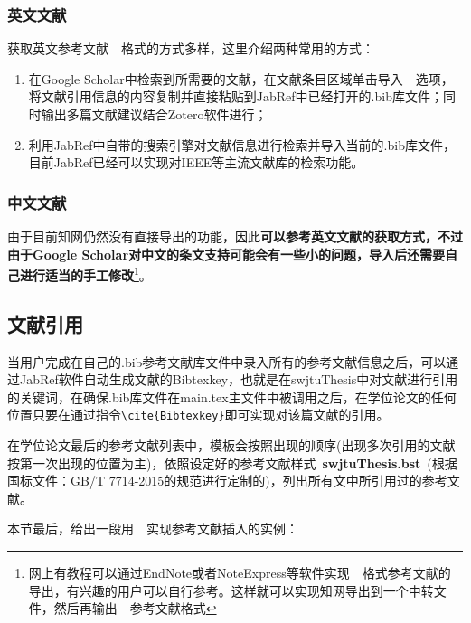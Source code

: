 \subsubsection{英文文献}
获取英文参考文献~\BibTeX{}~格式的方式多样，这里介绍两种常用的方式：

\begin{enumerate}
	\item 在Google Scholar中检索到所需要的文献，在文献条目区域单击导入~\BibTeX{}~选项，将文献引用信息的内容复制并直接粘贴到JabRef中已经打开的.bib库文件；同时输出多篇文献建议结合Zotero软件进行；
	\item 利用JabRef中自带的搜索引擎对文献信息进行检索并导入当前的.bib库文件，目前JabRef已经可以实现对IEEE等主流文献库的检索功能。
\end{enumerate}

\subsubsection{中文文献}
由于目前知网仍然没有直接导出\BibTeX{}的功能，因此\textbf{可以参考英文文献的\BibTeX{}获取方式，不过由于Google Scholar对中文的条文支持可能会有一些小的问题，导入后还需要自己进行适当的手工修改}\footnote{网上有教程可以通过EndNote或者NoteExpress等软件实现~\BibTeX{}~格式参考文献的导出，有兴趣的用户可以自行参考。这样就可以实现知网导出到一个中转文件，然后再输出~\BibTeX{}~参考文献格式}。

\subsection{文献引用}
当用户完成在自己的.bib参考文献库文件中录入所有的参考文献信息之后，可以通过JabRef软件自动生成文献的Bibtexkey，也就是在swjtuThesis中对文献进行引用的关键词，在确保.bib库文件在main.tex主文件中被调用之后，在学位论文的任何位置只要在通过指令\verb|\cite{Bibtexkey}|即可实现对该篇文献的引用。

在学位论文最后的参考文献列表中，模板会按照出现的顺序(出现多次引用的文献按第一次出现的位置为主)，依照设定好的参考文献样式~\textbf{swjtuThesis.bst}~(根据国标文件：GB/T 7714-2015的规范进行定制的)，列出所有文中所引用过的参考文献。

本节最后，给出一段用~\BibTeX{}~实现参考文献插入的实例：

